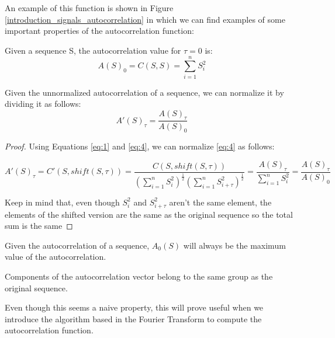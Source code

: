 An example of this function is shown in Figure
\ref{introduction_signals_autocorrelation} in which we can find examples of
some important properties of the autocorrelation function:

\begin{theorem}\label{theorem:1.2.1}
  Given a sequence S, the autocorrelation value for $\tau = 0$ is:
    \begin{equation}
      A(S)_{0}=C(S, S)=\sum_{i=1}^{n}S_{i}^2
    \end{equation}
\end{theorem}

\begin{corollary}
  Given the unnormalized autocorrelation of a sequence, we can
  normalize it by dividing it as follows:
  \begin{equation}
    A'(S)_{\tau} = \frac{A(S)_{\tau}}{A(S)_{0}}
  \end{equation}
\end{corollary}

\begin{proof}
  Using Equations \ref{eq:1} and \ref{eq:4}, we can normalize \ref{eq:4} as
  follows:

    $$A'(S)_{\tau} = C'(S, shift(S, \tau)) = \frac{C(S, shift(S, \tau))}{(\sum_{i=1}^{n} S_{i}^{2})^{\frac{1}{2}}(\sum_{i=1}^{n} S_{i+\tau}^{2})^\frac{1}{2}} = \frac{A(S)_{\tau}}{\sum_{i=1}^{n} S_{i}^{2}} = \frac{A(S)_{\tau}}{A(S)_{0}}$$

  Keep in mind that, even though $S_{i}^2$ and $S_{i+\tau}^2$ aren't the same element, the elements of the shifted version are the same as the original sequence so the total sum is the same
\end{proof}

\begin{corollary}
  Given the autocorrelation of a sequence, $A_{0}(S)$ will always be the maximum value of the autocorrelation.
\end{corollary}

\begin{theorem}
 Components of the autocorrelation vector belong to the same group as the
  original sequence.
\end{theorem}

Even though this seems a naive property, this will prove
useful when we introduce the algorithm based in the Fourier Transform to
compute the autocorrelation function.









